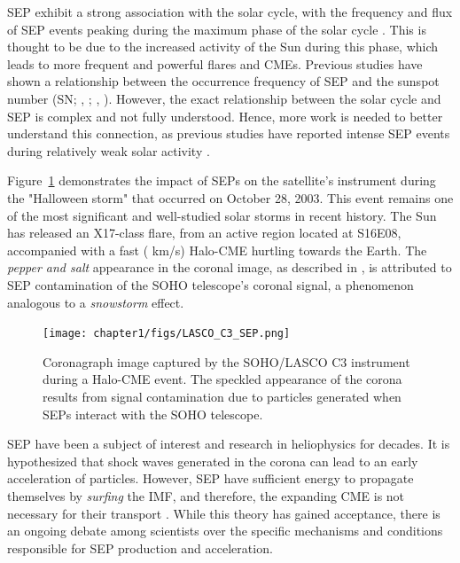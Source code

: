 SEP exhibit a strong association with the solar cycle, with the frequency and flux of SEP events peaking during the maximum phase of the solar cycle \citep{reames_2013}. This is thought to be due to the increased activity of the Sun during this phase, which leads to more frequent and powerful flares and CMEs. Previous studies have shown a relationship between the occurrence frequency of SEP and the sunspot number (SN; \citeauthor{nymmik_2007}, \citeyear{nymmik_2007}; \citeauthor{richardson_2016}, \citeyear{richardson_2016}). However, the exact relationship between the solar cycle and SEP is complex and not fully understood. Hence, more work is needed to better understand this connection, as previous studies have reported intense SEP events during relatively weak solar activity \citep{cohen_2018, ramstad_2018}.

Figure~\ref{fig_lasco_sep} demonstrates the impact of SEPs on the satellite's instrument during the "Halloween storm" that occurred on October 28, 2003. This event remains one of the most significant and well-studied solar storms in recent history. The Sun has released an X17-class flare, from an active region located at S16E08, accompanied with a fast ( km/s) Halo-CME hurtling towards the Earth. The \textit{pepper and salt} appearance in the coronal image, as described in \citet{gopalswamy_2019}, is attributed to SEP contamination of the SOHO telescope's coronal signal, a phenomenon analogous to a \textit{snowstorm} effect.

\begin{figure}[!htp]
	\centerline{\texttt{[image: chapter1/figs/LASCO\_C3\_SEP.png]}}
	\caption{Coronagraph image captured by the SOHO/LASCO C3 instrument during a Halo-CME event. The speckled appearance of the corona results from signal contamination due to particles generated when SEPs interact with the SOHO telescope.}
	\label{fig_lasco_sep}
\end{figure}

SEP have been a subject of interest and research in heliophysics for decades. It is hypothesized that shock waves generated in the corona can lead to an early acceleration of particles. However, SEP have sufficient energy to propagate themselves by \textit{surfing} the IMF, and therefore, the expanding CME is not necessary for their transport \citep{reames_2000, kota_2005, kozarev_2019, kozarev_2022}. While this theory has gained acceptance, there is an ongoing debate among scientists over the specific mechanisms and conditions responsible for SEP production and acceleration.

